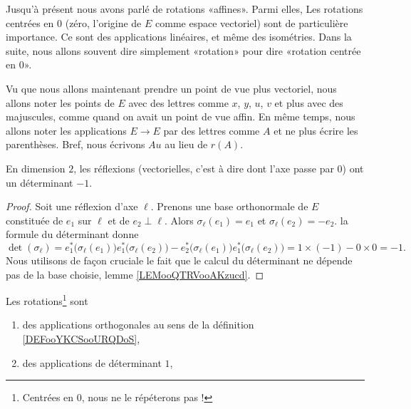\begin{normaltext}      \label{NORMooOUDJooRfbDEX}
    Jusqu'à présent nous avons parlé de rotations «affines». Parmi elles, Les rotations centrées en \( 0\) (zéro, l'origine de \( E\) comme espace vectoriel) sont de particulière importance. Ce sont des applications linéaires, et même des isométries. Dans la suite, nous allons souvent dire simplement «rotation» pour dire «rotation centrée en \( 0\)».

    Vu que nous allons maintenant prendre un point de vue plus vectoriel, nous allons noter les points de \( E\) avec des lettres comme \( x\), \( y\), \( u\), \( v\) et plus avec des majuscules, comme quand on avait un point de vue affin. En même temps, nous allons noter les applications \( E\to E \) par des lettres comme \( A\) et ne plus écrire les parenthèses. Bref, nous écrivons \( Au\) au lieu de \( r(A)\).
\end{normaltext}

\begin{lemma}       \label{LEMooSYZYooWDFScw}
    En dimension \( 2\), les réflexions (vectorielles, c'est à dire dont l'axe passe par \( 0\)) ont un déterminant \( -1\).
\end{lemma}

\begin{proof}
    Soit une réflexion d'axe \( \ell\). Prenons une base orthonormale de \( E\) constituée de \( e_1\) sur \( \ell\) et de \( e_2\perp \ell\). Alors \( \sigma_{\ell}(e_1)=e_1\) et \( \sigma_{\ell}(e_2)=-e_2\). la formule du déterminant donne
    \begin{equation}
        \det(\sigma_{\ell})=e_1^*\big( \sigma_{\ell}(e_1) \big)e_1^*\big( \sigma_{\ell}(e_2) \big)-e_2^*\big( \sigma_{\ell}(e_1) \big)e_1^*\big( \sigma_{\ell}(e_2) \big)=1\times (-1)-0\times 0=-1.
    \end{equation}
    Nous utilisons de façon cruciale le fait que le calcul du déterminant ne dépende pas de la base choisie, lemme \ref{LEMooQTRVooAKzucd}.
\end{proof}

\begin{proposition}     \label{PROPooTUJWooAjtEnQ}
    Les rotations\footnote{Centrées en \( 0\), nous ne le répéterons pas !} sont 
    \begin{enumerate}
        \item
            des applications orthogonales au sens de la définition \ref{DEFooYKCSooURQDoS},
        \item
             des applications de déterminant \( 1\),
    \end{enumerate}
\end{proposition}

